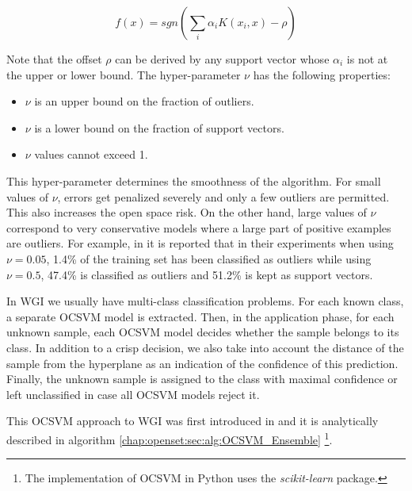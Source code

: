 \begin{equation}
    f(x) = sgn(\sum_i \alpha_i K(x_i,x) - \rho)
\end{equation}

Note that the offset $\rho$ can be derived by any support vector whose $\alpha_i$ is not at the upper or lower bound. The hyper-parameter $\nu$ has the following properties:

\begin{itemize}
	\item $\nu$ is an upper bound on the fraction of outliers.
	\item $\nu$ is a lower bound on the fraction of support vectors.
	\item $\nu$ values cannot exceed 1.
\end{itemize}

This hyper-parameter determines the smoothness of the algorithm. For small values of $\nu$, errors get penalized severely and only a few outliers are permitted. This also increases the open space risk. On the other hand, large values of $\nu$ correspond to very conservative models where a large part of  positive examples are outliers. For example, in \parencite{scholkopf1999estimating} it is reported that in their experiments when using $\nu=0.05$, 1.4\% of the training set has been classified as outliers while using $\nu=0.5$, 47.4\% is classified as outliers and 51.2\% is kept as support vectors.

In WGI we usually have multi-class classification problems. For each known class, a separate OCSVM model is extracted. Then, in the application phase, for each unknown sample, each OCSVM model decides whether the sample belongs to its class. In addition to a crisp decision, we also take into account the distance of the sample from the hyperplane as an indication of the confidence of this prediction. Finally, the unknown sample is assigned to the class with maximal confidence or left unclassified in case all OCSVM models reject it. 

This OCSVM approach to WGI was first introduced in \parencite{pritsos2013open} and it is analytically described in algorithm \ref{chap:openset:sec:alg:OCSVM_Ensemble} \footnote{The implementation of OCSVM in Python uses the \textit{scikit-learn} package.}.

